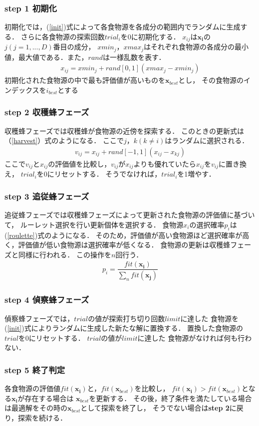\subsubsection*{step 1 初期化}
初期化では，(\ref{init})式によって各食物源を各成分の範囲内でランダムに生成する．
さらに各食物源の探索回数$trial_i$を0に初期化する．
$x_{ij}$は$\boldsymbol{x_{i}}$の$j(j=1,...,D)$番目の成分， 
$xmin_j$，$xmax_j$はそれぞれ食物源の各成分の最小値，最大値である．また，$rand$は一様乱数を表す． 
\begin{align}
    x_{ij} = xmin_j + rand[0,1](xmax_j-xmin_j)\label{init}
\end{align}
初期化された食物源の中で最も評価値が高いものを$\boldsymbol{x}_{best}$とし，
その食物源のインデックスを$i_{best}$とする
\subsubsection*{step 2 収穫蜂フェーズ}
収穫蜂フェーズでは収穫蜂が食物源の近傍を探索する．
このときの更新式は（\ref{harvest}）式のようになる．
ここで$j，k(k\neq i)$はランダムに選択される．
\begin{align}
v_{ij} = x_{ij} + rand[-1,1](x_{ij}-x_{kj})\label{harvest}
\end{align}
ここで$v_{ij}$と$x_{ij}$の評価値を比較し，$v_{ij}$が$x_{ij}$よりも優れていたら$x_{ij}$を$v_{ij}$に置き換え，
$trial_i$を0にリセットする．
そうでなければ，$trial_i$を1増やす．
\subsubsection*{step 3 追従蜂フェーズ}
追従蜂フェーズでは収穫蜂フェーズによって更新された食物源の評価値に基づいて，
ルーレット選択を行い更新個体を選択する．
食物源$x_i$の選択確率$p_i$は(\ref{roulette})式のようになる．
そのため，評価値が高い食物源ほど選択確率が高く，評価値が低い食物源は選択確率が低くなる．
食物源の更新は収穫蜂フェーズと同様に行われる．
この操作を$n$回行う．
\begin{align}
    p_i = \dfrac{fit(\boldsymbol{x_{i}})}{\sum_{n}fit(\boldsymbol{x_{j}})}\label{roulette}
\end{align}
\subsubsection*{step 4 偵察蜂フェーズ}
偵察蜂フェーズでは，$trial$の値が探索打ち切り回数$limit$に達した
食物源を(\ref{init})式によりランダムに生成した新たな解に置換する． 
置換した食物源の$trial$を0にリセットする．
$trial$の値が$limit$に達した
食物源がなければ何も行わない．
\subsubsection*{step 5 終了判定}
各食物源の評価値$fit(\boldsymbol{x_{i}})$と，$fit(\boldsymbol{x}_{best})$を比較し，
$fit(\boldsymbol{x_{i}}) > fit(\boldsymbol{x}_{best})$となる$\boldsymbol{x_{i}}$が存在する場合は
$\boldsymbol{x}_{best}$を更新する．
その後，終了条件を満たしている場合は最適解をその時の$\boldsymbol{x}_{best}$として探索を終了し，
そうでない場合は\textbf{step 2}に戻り，探索を続ける．
